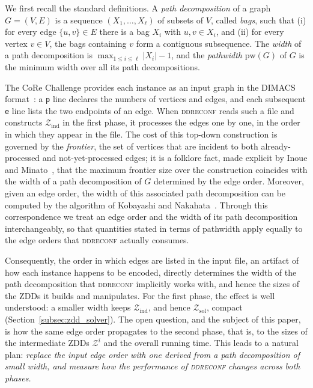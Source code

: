 \documentclass[conference]{IEEEtran}
\newcommand{\Z}{\mathcal{Z}}
\newcommand{\zind}{\mathcal{Z}_{\mathrm{ind}}}
\newcommand{\zsol}{\mathcal{Z}_{\mathrm{sol}}}
\begin{document}
We first recall the standard definitions.
A \emph{path decomposition} of a graph $G = (V, E)$ is a sequence
$(X_1, \dots, X_\ell)$ of subsets of $V$, called \emph{bags}, such that
(i) for every edge $\{u, v\} \in E$ there is a bag $X_i$ with $u, v \in X_i$, and
(ii) for every vertex $v \in V$, the bags containing $v$ form a contiguous
subsequence. The \emph{width} of a path decomposition is
$\max_{1 \le i \le \ell} |X_i| - 1$, and the \emph{pathwidth} $\mathrm{pw}(G)$ of
$G$ is the minimum width over all its path decompositions.

The CoRe Challenge provides each instance as an input graph in the DIMACS
format~\cite{sotaokit24}: a \texttt{p} line declares the numbers of vertices and
edges, and each subsequent \texttt{e} line lists the two endpoints of an edge.
When \textsc{ddreconf} reads such a file and constructs $\zind$ in the first
phase, it processes the edges one by one, in the order in which they appear in
the file. The cost of this top-down construction is governed by the
\emph{frontier}, the set of vertices that are incident to both already-processed
and not-yet-processed edges; it is a folklore fact, made explicit by Inoue and
Minato~\cite{inoue16}, that the maximum frontier size over the construction
coincides with the width of a path decomposition of $G$ determined by the edge
order. Moreover, given an edge order, the width of this associated path
decomposition can be computed by the algorithm of Kobayashi and
Nakahata~\cite[Lemma~2]{KobayashiNakahata2020}. Through this correspondence we
treat an edge order and the width of its path decomposition interchangeably, so
that quantities stated in terms of pathwidth apply equally to the edge orders
that \textsc{ddreconf} actually consumes.

Consequently, the order in which edges are listed in the input file, an artifact
of how each instance happens to be encoded, directly determines the width of the
path decomposition that \textsc{ddreconf} implicitly works with, and hence the
sizes of the ZDDs it builds and manipulates. For the first phase, the effect is
well understood: a smaller width keeps $\zind$, and hence $\zsol$, compact
(Section~\ref{subsec:zdd_solver}). The open question, and the subject of this
paper, is how the same edge order propagates to the second phase, that is, to the
sizes of the intermediate ZDDs $\Z^{i}$ and the overall running time. This leads
to a natural plan: \emph{replace the input edge order with one derived from a
path decomposition of small width, and measure how the performance of
\textsc{ddreconf} changes across both phases.}
\end{document}
